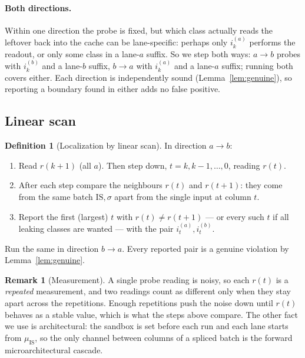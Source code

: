 \documentclass[11pt]{article}
\theoremstyle{definition}
\newtheorem{definition}{Definition}
\newtheorem{remark}{Remark}
\theoremstyle{plain}
\newcommand{\IS}{\mathrm{IS}}
\newcommand{\inp}[2]{i_{#1}^{(#2)}}
\begin{document}
\paragraph{Both directions.}
Within one direction the probe is fixed, but which class actually reads the leftover
back into the cache can be lane-specific: perhaps only $\inp{k}{a}$ performs the
readout, or only some class in a lane-$a$ suffix. So we step both ways:
$a\to b$ probes with $\inp{k}{b}$ and a lane-$b$ suffix, $b\to a$ with $\inp{k}{a}$ and a
lane-$a$ suffix; running both covers either. Each direction is independently sound
(Lemma~\ref{lem:genuine}), so reporting a boundary found in either adds no false
positive.

\subsection{Linear scan}

\begin{definition}[Localization by linear scan]
\label{def:alg}
In direction $a\to b$:
\begin{enumerate}[label=\arabic*.,nosep,leftmargin=*]
\item Read $r(k+1)$ (all $a$). Then step down, $t=k,k-1,\dots,0$, reading
      $r(t)$.
\item After each step compare the neighbours $r(t)$ and $r(t+1)$: they come from the
      same batch $\IS,\sigma$ apart from the single input at column $t$.
\item Report the first (largest) $t$ with $r(t)\neq r(t+1)$ --- or every such $t$ if all
      leaking classes are wanted --- with the pair $\inp{t}{a},\inp{t}{b}$.
\end{enumerate}
Run the same in direction $b\to a$. Every reported pair is a genuine violation by
Lemma~\ref{lem:genuine}.
\end{definition}

\begin{remark}[Measurement]
\label{rem:measure}
A single probe reading is noisy, so each $r(t)$ is a \emph{repeated} measurement, and
two readings count as different only when they stay apart across the repetitions.
Enough repetitions push the noise down until $r(t)$ behaves as a stable value, which is
what the steps above compare. The other fact we use is architectural: the sandbox is
set before each run and each lane starts from $\mu_\IS$, so the only channel between
columns of a spliced batch is the forward microarchitectural cascade.
\end{remark}
\end{document}
